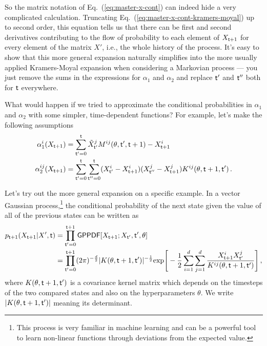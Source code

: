 \documentclass{book}
\begin{document}
So the matrix notation of Eq.~(\ref{eq:master-x-cont}) can indeed hide a very complicated calculation. Truncating Eq.~(\ref{eq:master-x-cont-kramers-moyal}) up to second order, this equation tells us that there can be first and second derivatives contributing to the flow of probability to each element of $X_{{\sf t}+1}$ for every element of the matrix $X'$, i.e., the whole history of the process. It's easy to show that this more general expansion naturally simplifies into the more usually applied Kramers-Moyal expansion when considering a Markovian process --- you just remove the sums in the expressions for $\alpha_1$ and $\alpha_2$ and replace ${\sf t}'$ and ${\sf t}''$ both for ${\sf t}$ everywhere.

What would happen if we tried to approximate the conditional probabilities in $\alpha_1$ and $\alpha_2$ with some simpler, time-dependent functions? For example, let's make the following assumptions
\begin{align}
\alpha^i_1(X_{{\sf t}+1}) &= \sum_{{\sf t}'=0}^{\sf t}\tilde{X}^j_{{\sf t}'}M^{ij}(\theta,{\sf t}', {\sf t}+1)-X^i_{{\sf t}+1} \\
\alpha^{ij}_2(X_{{\sf t}+1}) &= \sum_{{\sf t}'=0}^{\sf t}\sum_{{\sf t}''=0}^{\sf t}(X^i_{{\sf t}'}-X^i_{{\sf t}+1})(X^j_{{\sf t}''}-X^j_{{\sf t}+1})K^{ij}(\theta, {\sf t}+1, {\sf t}') \,.
\end{align}

Let's try out the more general expansion on a specific example. In a vector Gaussian process,\footnote{This process is very familiar in machine learning and can be a powerful tool to learn non-linear functions through deviations from the expected value.} the conditional probability of the next state given the value of all of the previous states can be written as 
\begin{align}
p_{{\sf t}+1}(X_{{\sf t}+1}\vert X',{\sf t}) &= \prod_{{\sf t}'=0}^{{\sf t}+1}{\sf GPPDF}[X_{{\sf t}+1};X_{{\sf t}'},{\sf t}',\theta] \\
&= \prod_{{\sf t}'=0}^{{\sf t}+1} (2\pi )^{-\frac{d}{2}}\vert K(\theta,{\sf t}+1, {\sf t}')\vert^{-\frac{1}{2}}{\rm exp}\Bigg[ -\frac{1}{2}\sum_{i=1}^d\sum_{j=1}^d\frac{X^i_{{\sf t}+1}X^j_{{\sf t}'}}{K^{ij}(\theta, {\sf t}+1, {\sf t}')}\Bigg] \label{eq:gaussian-proc-cond-p}\,,
\end{align}
where $K(\theta, {\sf t}+1, {\sf t}')$ is a covariance kernel matrix which depends on the timesteps of the two compared states and also on the hyperparameters $\theta$. We write $\vert K(\theta, {\sf t}+1, {\sf t}') \vert$ meaning its determinant.
\end{document}
